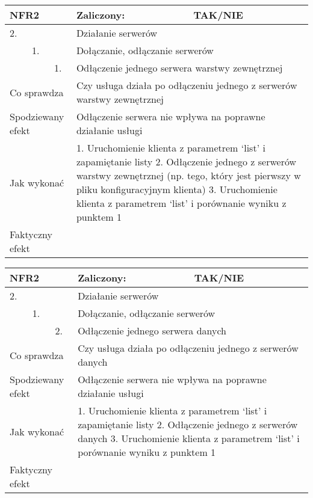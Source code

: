 \begin{tabular}{|p{20pt}|p{20pt}|p{20pt}|p{250pt}|p{60pt}|}
	\hline
	\multicolumn{3}{|p{70pt}|}{NFR2} & Zaliczony: & TAK/NIE \\ \hline
	2. & & & \multicolumn{2}{|p{310pt}|}{Działanie serwerów } \\ \hline
	& 1. & & \multicolumn{2}{|p{310pt}|}{Dołączanie, odłączanie serwerów } \\ \hline
	& & 1. & \multicolumn{2}{|p{310pt}|}{Odłączenie jednego serwera warstwy zewnętrznej } \\ \hline
	\multicolumn{3}{|p{70pt}|}{Co sprawdza} & \multicolumn{2}{|p{310pt}|}{Czy usługa działa po odłączeniu jednego z serwerów warstwy zewnętrznej} \\ \hline
	\multicolumn{3}{|p{70pt}|}{Spodziewany efekt} & \multicolumn{2}{|p{310pt}|}{Odłączenie serwera nie wpływa na poprawne działanie usługi} \\ \hline
	\multicolumn{3}{|p{70pt}|}{Jak wykonać} & \multicolumn{2}{|p{310pt}|}{1. Uruchomienie klienta z parametrem ‘list’ i zapamiętanie listy
2. Odłączenie jednego z serwerów warstwy zewnętrznej (np. tego, który jest pierwszy w pliku konfiguracyjnym klienta)
3. Uruchomienie klienta z parametrem ‘list’ i porównanie wyniku z punktem 1} \\ \hline
	\multicolumn{3}{|p{70pt}|}{Faktyczny efekt} & \multicolumn{2}{|p{310pt}|}{} \\ \hline
\end{tabular}

\begin{tabular}{|p{20pt}|p{20pt}|p{20pt}|p{250pt}|p{60pt}|}
	\hline
	\multicolumn{3}{|p{70pt}|}{NFR2} & Zaliczony: & TAK/NIE \\ \hline
	2. & & & \multicolumn{2}{|p{310pt}|}{Działanie serwerów } \\ \hline
	& 1. & & \multicolumn{2}{|p{310pt}|}{Dołączanie, odłączanie serwerów } \\ \hline
	& & 2. & \multicolumn{2}{|p{310pt}|}{Odłączenie jednego serwera danych } \\ \hline
	\multicolumn{3}{|p{70pt}|}{Co sprawdza} & \multicolumn{2}{|p{310pt}|}{Czy usługa działa po odłączeniu jednego z serwerów danych} \\ \hline
	\multicolumn{3}{|p{70pt}|}{Spodziewany efekt} & \multicolumn{2}{|p{310pt}|}{Odłączenie serwera nie wpływa na poprawne działanie usługi} \\ \hline
	\multicolumn{3}{|p{70pt}|}{Jak wykonać} & \multicolumn{2}{|p{310pt}|}{1. Uruchomienie klienta z parametrem ‘list’ i zapamiętanie listy
2. Odłączenie jednego z serwerów danych
3. Uruchomienie klienta z parametrem ‘list’ i porównanie wyniku z punktem 1} \\ \hline
	\multicolumn{3}{|p{70pt}|}{Faktyczny efekt} & \multicolumn{2}{|p{310pt}|}{} \\ \hline
\end{tabular}

